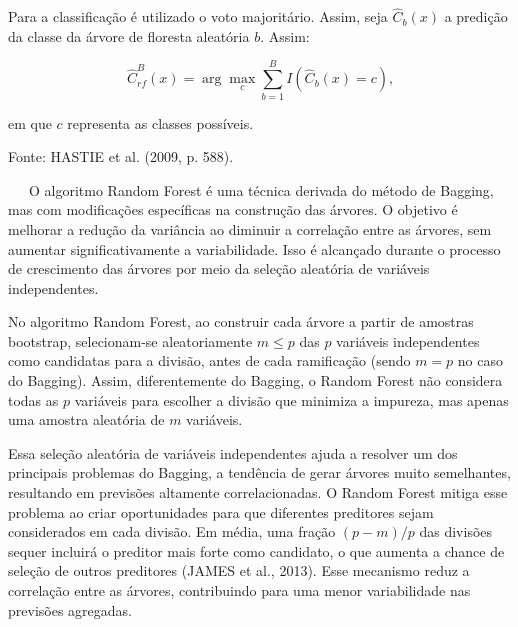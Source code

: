 \documentclass[
  12pt,
  a4paper,
]{scrreprt}
\begin{document}
\begin{algo}
{\begin{algorithm}[H]
\begin{algorithmic}
\vspace{1em}

\State \hspace{0.7em} Para a classificação é utilizado o voto majoritário. Assim, seja $\hat{C}_{b}\left(x\right)$ a predição da classe da árvore de floresta aleatória $b$. Assim:

$$
\hat{C}^{B}_{rf}\left(x\right) = \arg \max_c \sum^{B}_{b = 1}I\left(\hat{C}_b\left(x\right) = c\right)\text{,}
$$

\State em que $c$ representa as classes possíveis.

\end{algorithmic}
\end{algorithm}

}

\caption{\label{algo-rf}Fonte: HASTIE et al. (2009, p. 588).}

\end{algo}%

~~~O algoritmo Random Forest é uma técnica derivada do método de
Bagging, mas com modificações específicas na construção das árvores. O
objetivo é melhorar a redução da variância ao diminuir a correlação
entre as árvores, sem aumentar significativamente a variabilidade. Isso
é alcançado durante o processo de crescimento das árvores por meio da
seleção aleatória de variáveis independentes.

\vspace{12pt}

No algoritmo Random Forest, ao construir cada árvore a partir de
amostras bootstrap, selecionam-se aleatoriamente \(m \leq p\) das \(p\)
variáveis independentes como candidatas para a divisão, antes de cada
ramificação (sendo \(m = p\) no caso do Bagging). Assim, diferentemente
do Bagging, o Random Forest não considera todas as \(p\) variáveis para
escolher a divisão que minimiza a impureza, mas apenas uma amostra
aleatória de \(m\) variáveis.

\vspace{12pt}

Essa seleção aleatória de variáveis independentes ajuda a resolver um
dos principais problemas do Bagging, a tendência de gerar árvores muito
semelhantes, resultando em previsões altamente correlacionadas. O Random
Forest mitiga esse problema ao criar oportunidades para que diferentes
preditores sejam considerados em cada divisão. Em média, uma fração
\((p - m)/p\) das divisões sequer incluirá o preditor mais forte como
candidato, o que aumenta a chance de seleção de outros preditores (JAMES
et al., 2013). Esse mecanismo reduz a correlação entre as árvores,
contribuindo para uma menor variabilidade nas previsões agregadas.
\end{document}
